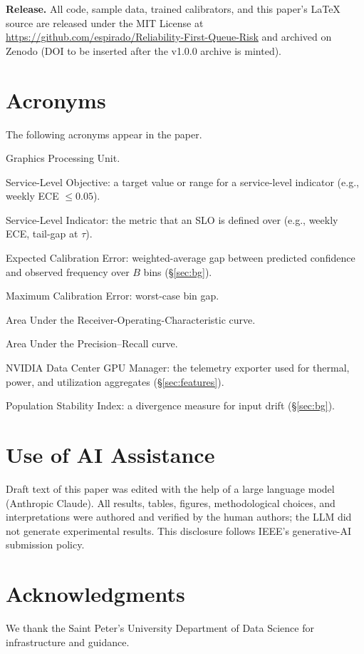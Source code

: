 \documentclass[conference]{IEEEtran}
\begin{document}
\textbf{Release.} All code, sample data, trained calibrators, and this paper's \LaTeX{} source are released under the MIT License at \url{https://github.com/espirado/Reliability-First-Queue-Risk} and archived on Zenodo (DOI to be inserted after the v1.0.0 archive is minted).

\appendix
\section*{Acronyms}
The following acronyms appear in the paper.
\begin{description}\setlength{\itemsep}{0pt}
\item[GPU] Graphics Processing Unit.
\item[SLO] Service-Level Objective: a target value or range for a service-level indicator (e.g., weekly ECE $\leq 0.05$).
\item[SLI] Service-Level Indicator: the metric that an SLO is defined over (e.g., weekly ECE, tail-gap at $\tau$).
\item[ECE] Expected Calibration Error: weighted-average gap between predicted confidence and observed frequency over $B$ bins (\S\ref{sec:bg}).
\item[MCE] Maximum Calibration Error: worst-case bin gap.
\item[AUROC] Area Under the Receiver-Operating-Characteristic curve.
\item[AUPRC] Area Under the Precision--Recall curve.
\item[DCGM] NVIDIA Data Center GPU Manager: the telemetry exporter used for thermal, power, and utilization aggregates (\S\ref{sec:features}).
\item[PSI] Population Stability Index: a divergence measure for input drift (\S\ref{sec:bg}).
\end{description}

\section*{Use of AI Assistance}
Draft text of this paper was edited with the help of a large language model (Anthropic Claude). All results, tables, figures, methodological choices, and interpretations were authored and verified by the human authors; the LLM did not generate experimental results. This disclosure follows IEEE's generative-AI submission policy.

\section*{Acknowledgments}
We thank the Saint Peter's University Department of Data Science for infrastructure and guidance.
\end{document}
